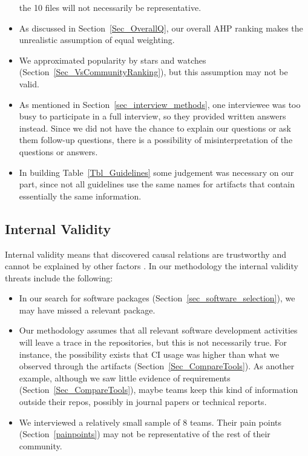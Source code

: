 \documentclass[final, 12pt, 3p, times]{elsarticle}
\begin{document}
\begin{itemize}
the 10 files will not necessarily be representative. 
\item As discussed in Section~\ref{Sec_OverallQ}, our overall AHP ranking makes
the unrealistic assumption of equal weighting.
\item We approximated popularity by stars and watches
(Section~\ref{Sec_VsCommunityRanking}), but this assumption may not be valid. 
\item As mentioned in Section~\ref{sec_interview_methods}, one interviewee was
too busy to participate in a full interview, so they provided written answers
instead. Since we did not have the chance to explain our questions or ask them
follow-up questions, there is a possibility of misinterpretation of the
questions or answers.
\item In building Table~\ref{Tbl_Guidelines} some judgement was necessary on our
part, since not all guidelines use the same names for artifacts that contain
essentially the same information.
\end{itemize}

\subsection{Internal Validity} \label{Sec_InternalValidity}

Internal validity means that discovered causal relations are trustworthy and
cannot be explained by other factors \cite{RunesonAndHost2009}. In our
methodology the internal validity threats include the following:

\begin{itemize}
\item In our search for software packages
(Section~\ref{sec_software_selection}), we may have missed a relevant package.
\item Our methodology assumes that all relevant software development activities
will leave a trace in the repositories, but this is not necessarily true. For
instance, the possibility exists that CI usage was higher than what we observed
through the artifacts (Section~\ref{Sec_CompareTools}). As another example,
although we saw little evidence of requirements
(Section~\ref{Sec_CompareTools}), maybe teams keep this kind of information
outside their repos, possibly in journal papers or technical reports.
\item We interviewed a relatively small sample of 8 teams.  Their pain points
(Section~\ref{painpoints}) may not be representative of the rest of their
community.
\end{itemize}
\end{document}
